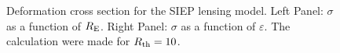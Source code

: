 \begin{figure}[!ht]
\caption{\label{dcs_siep} Deformation cross section for the  SIEP lensing model. Left Panel:
$\sigma$ as a function of $R_{\rm E}$. Right Panel: $\sigma$ as a function of $\varepsilon$.
The calculation were made for $R_{\rm th}=10$.
}
\end{figure}
